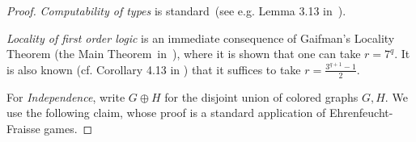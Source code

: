 \begin{proof}%

\emph{Computability of types} is standard~(see e.g. Lemma 3.13 in~\cite{libkin}).

\emph{Locality of first order logic} is an
immediate consequence of Gaifman's Locality Theorem
(the Main Theorem~in~\cite{gaifman1982local}),
where it is shown that one can take $r=7^q$.
It is also known (cf. Corollary 4.13 in \cite{libkin}) that it suffices to take $r=\frac{3^{q+1}-1}2$.


%

For \emph{Independence}, write $G\oplus H$ for the disjoint union of colored graphs $G,H$. 
We use the following claim, whose proof is a standard application of Ehrenfeucht-Fraisse games.



\end{proof}
